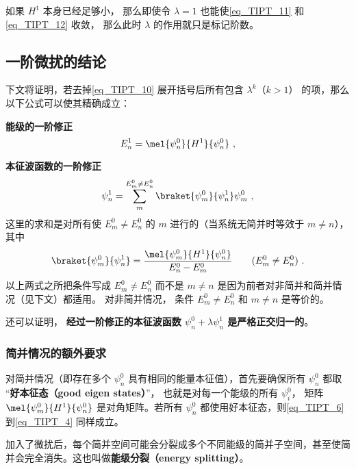 如果 $H^1$ 本身已经足够小， 那么即使令 $\lambda = 1$ 也能使\autoref{eq_TIPT_11} 和\autoref{eq_TIPT_12} 收敛， 那么此时 $\lambda$ 的作用就只是标记阶数。

\subsection{一阶微扰的结论}
下文将证明，若去掉\autoref{eq_TIPT_10} 展开括号后所有包含 $\lambda^k$（$k>1$） 的项，那么以下公式可以使其精确成立：

\textbf{能级的一阶修正}
\begin{equation}\label{eq_TIPT_6}
E_n^1 = \mel{\psi_n^0}{H^1}{\psi_n^0}~,
\end{equation}

\textbf{本征波函数的一阶修正}
\begin{equation}\label{eq_TIPT_5}
\psi_n^1 = \sum_m^{E_m^0 \ne E_n^0} \braket{\psi_m^0}{\psi_n^1} \psi_m^0~,
\end{equation}
这里的求和是对所有使 $E_m^0 \ne E_n^0$ 的 $m$ 进行的（当系统无简并时等效于 $m\ne n$）， 其中
\begin{equation}\label{eq_TIPT_4}
\braket{\psi_m^0}{\psi_n^1} = \frac{\mel{\psi_m^0}{H^1}{\psi_n^0}}{E_n^0 - E_m^0} \qquad (E_m^0 \ne E_n^0)~.
\end{equation}
以上两式之所把条件写成 $E_m^0 \ne E_n^0$ 而不是 $m \ne n$ 是因为前者对非简并和简并情况（见下文）都适用。 对非简并情况， 条件 $E_m^0 \ne E_n^0$ 和 $m \ne n$ 是等价的。

还可以证明， \textbf{经过一阶修正的本征波函数 $\psi_n^0 + \lambda\psi_n^1$ 是严格正交归一的}。

\subsubsection{简并情况的额外要求}
对简并情况（即存在多个 $\psi_n^0$ 具有相同的能量本征值），首先要确保所有 $\psi_n^0$ 都取 “\textbf{好本征态（good eigen states）}”， 也就是对每一个能级的所有 $\psi_i^0$， 矩阵 $\mel{\psi_m^0}{H^1}{\psi_n^0}$ 是对角矩阵。若所有 $\psi_n^0$ 都使用好本征态，则\autoref{eq_TIPT_6} 到\autoref{eq_TIPT_4} 同样成立。

加入了微扰后，每个简并空间可能会分裂成多个不同能级的简并子空间，甚至使简并会完全消失。这也叫做\textbf{能级分裂（energy splitting）}。


